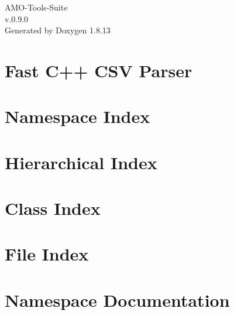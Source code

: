 \documentclass[twoside]{book}
\newcommand{\+}{\discretionary{\mbox{\scriptsize$\hookleftarrow$}}{}{}}
\newcommand{\clearemptydoublepage}{%
  \newpage{\pagestyle{empty}\cleardoublepage}%
}
\begin{document}
\hypersetup{pageanchor=false,
             bookmarksnumbered=true,
             pdfencoding=unicode
            }
\begin{titlepage}
\vspace*{7cm}
\begin{center}%
{\Large A\+M\+O-\/\+Tools-\/\+Suite \\[1ex]\large v.\+0.\+9.\+0 }\\
\vspace*{1cm}
{\large Generated by Doxygen 1.8.13}\\
\end{center}
\end{titlepage}
\clearemptydoublepage
{}
\tableofcontents
\clearemptydoublepage
{}
\hypersetup{pageanchor=true}

\chapter{Fast C++ C\+SV Parser}
\label{index}\hypertarget{index}{}
\chapter{Namespace Index}

\chapter{Hierarchical Index}

\chapter{Class Index}

\chapter{File Index}

\chapter{Namespace Documentation}

\end{document}
